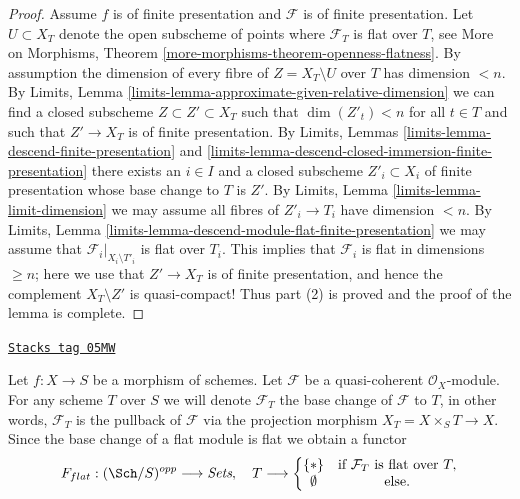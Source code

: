 \begin{proof}
\medskip\noindent
Assume $f$ is of finite presentation and $\mathcal{F}$ is of finite
presentation. Let $U \subset X_T$ denote the open subscheme of points where
$\mathcal{F}_T$ is flat over $T$, see
More on Morphisms, Theorem \ref{more-morphisms-theorem-openness-flatness}.
By assumption the dimension of every fibre of $Z = X_T \setminus U$ over
$T$ has dimension $< n$. By
Limits, Lemma \ref{limits-lemma-approximate-given-relative-dimension}
we can find a closed subscheme $Z \subset Z' \subset X_T$
such that $\dim(Z'_t) < n$ for all $t \in T$ and such that
$Z' \to X_T$ is of finite presentation. By
Limits, Lemmas \ref{limits-lemma-descend-finite-presentation} and
\ref{limits-lemma-descend-closed-immersion-finite-presentation}
there exists an $i \in I$ and a closed subscheme $Z'_i \subset X_i$
of finite presentation whose base change to $T$ is $Z'$. By
Limits, Lemma \ref{limits-lemma-limit-dimension}
we may assume all fibres of $Z'_i \to T_i$ have dimension $< n$. By
Limits, Lemma \ref{limits-lemma-descend-module-flat-finite-presentation}
we may assume that $\mathcal{F}_i|_{X_i \setminus T'_i}$
is flat over $T_i$. This implies that $\mathcal{F}_i$ is
flat in dimensions $\geq n$; here we use that $Z' \to X_T$ is of finite
presentation, and hence the complement $X_T \setminus Z'$ is quasi-compact!
Thus part (2) is proved and the proof of the lemma is complete.
\end{proof}

\begin{definition}
\label{flat-situation-flat}
\href{https://stacks.math.columbia.edu/tag/05MW}{\texttt{Stacks tag 05MW}}

Let $f : X \to S$ be a morphism of schemes.
Let $\mathcal{F}$ be a quasi-coherent $\mathcal{O}_X$-module.
For any scheme $T$ over $S$ we will denote $\mathcal{F}_T$ the
base change of $\mathcal{F}$ to $T$, in other words, $\mathcal{F}_T$
is the pullback of $\mathcal{F}$ via the projection morphism
$X_T = X \times_S T \to X$. Since the base change of a flat module
is flat we obtain a functor
\begin{equation}
\label{equation-flat}
F_{flat} : (\Sch/S)^{opp} \longrightarrow \textit{Sets}, \quad
T \longrightarrow \left\{
\begin{matrix}
\{*\} & \text{if } \mathcal{F}_T \text{ is flat over }T, \\
\emptyset & \text{else.}
\end{matrix}
\right.
\end{equation}
\end{definition}

